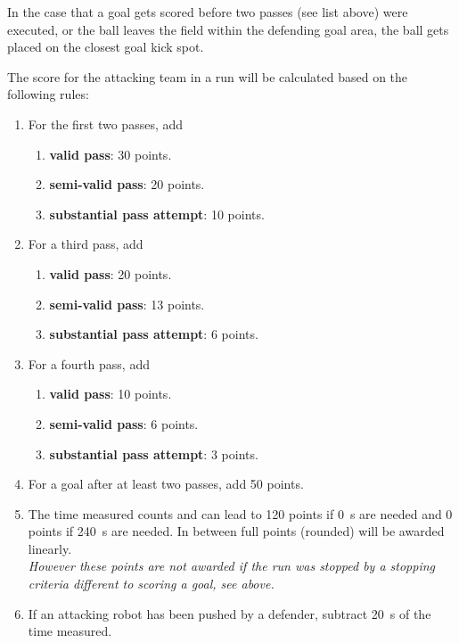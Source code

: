 In the case that a goal gets scored before two passes (see list above) were executed, or the ball leaves the field within the defending goal area, the ball gets placed on the closest goal kick spot.

The score for the attacking team in a run will be calculated based on the following rules:

\begin{enumerate}
	\item For the first two passes, add 
	\begin{enumerate}
		\item \textbf{valid pass}: \qty{30}{} points.
		\item \textbf{semi-valid pass}: \qty{20}{} points.
		\item \textbf{substantial pass attempt}: \qty{10}{} points.
	\end{enumerate}
	\item For a third pass, add
	\begin{enumerate}
		\item \textbf{valid pass}: \qty{20}{} points.
		\item \textbf{semi-valid pass}: \qty{13}{} points.
		\item \textbf{substantial pass attempt}: \qty{6}{} points.
	\end{enumerate}
	\item For a fourth pass, add
	\begin{enumerate}
		\item \textbf{valid pass}: \qty{10}{} points.
		\item \textbf{semi-valid pass}: \qty{6}{} points.
		\item \textbf{substantial pass attempt}: \qty{3}{} points.
	\end{enumerate}
	\item For a goal after at least two passes, add \qty{50}{} points.
	\item The time measured counts and can lead to \qty{120}{} points if \qty{0}{\second} are needed and \qty{0}{} points if \qty{240}{\second} are needed. In between full points (rounded) will be awarded linearly. \\
	\textit{However these points are not awarded if the run was stopped by a stopping criteria different to scoring a goal, see above.}
	\item If an attacking robot has been pushed by a defender, subtract \qty{20}{\second} of the time measured.
\end{enumerate}

